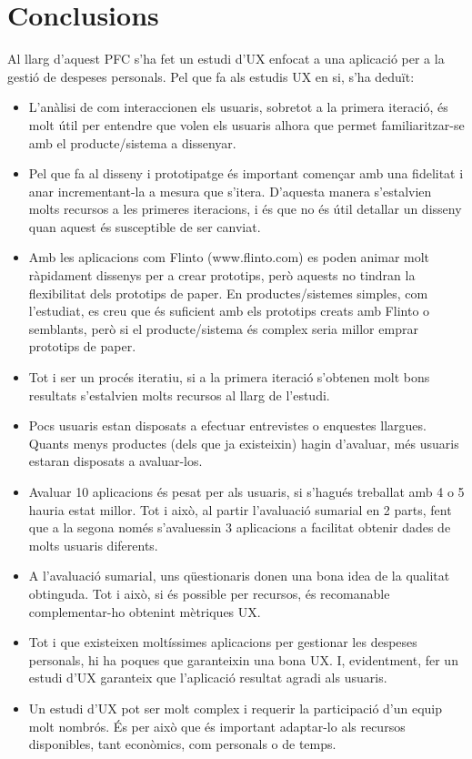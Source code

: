 \chapter{Conclusions}

Al llarg d'aquest \ac{PFC} s'ha fet un estudi d'\ac{UX} enfocat a una aplicació per a la gestió de despeses personals. Pel que fa als estudis \ac{UX} en si, s'ha deduït:

\begin{itemize}
\item L'anàlisi de com interaccionen els usuaris, sobretot a la primera iteració, és molt útil per entendre que volen els usuaris alhora que permet familiaritzar-se amb el producte/sistema a dissenyar.
\item Pel que fa al disseny i prototipatge és important començar amb una fidelitat i anar incrementant-la a mesura que s'itera. D'aquesta manera s'estalvien molts recursos a les primeres iteracions, i és que no és útil detallar un disseny quan aquest és susceptible de ser canviat. %
\item Amb les aplicacions com Flinto (www.flinto.com) es poden animar molt ràpidament dissenys per a crear prototips, però aquests no tindran la flexibilitat dels prototips de paper. En productes/sistemes simples, com l'estudiat, es creu que és suficient amb els prototips creats amb Flinto o semblants, però si el producte/sistema és complex seria millor emprar prototips de paper.
\item Tot i ser un procés iteratiu, si a la primera iteració s'obtenen molt bons resultats s'estalvien molts recursos al llarg de l'estudi. 
\item Pocs usuaris estan disposats a efectuar entrevistes o enquestes llargues. Quants menys productes (dels que ja existeixin) hagin d'avaluar, més usuaris estaran disposats a avaluar-los. 
\item Avaluar 10 aplicacions és pesat per als usuaris, si s'hagués treballat amb 4 o 5 hauria estat millor. Tot i això, al partir l'avaluació sumarial en 2 parts, fent que a la segona només s'avaluessin 3 aplicacions a facilitat obtenir dades de molts usuaris diferents. 
\item A l'avaluació sumarial, uns qüestionaris donen una bona idea de la qualitat obtinguda. Tot i això, si és possible per recursos, és recomanable complementar-ho obtenint mètriques \ac{UX}.
\item Tot i que existeixen moltíssimes aplicacions per gestionar les despeses personals, hi ha poques que garanteixin una bona \ac{UX}. I, evidentment, fer un estudi d'\ac{UX} garanteix que l'aplicació resultat agradi als usuaris. 
\item Un estudi d'\ac{UX} pot ser molt complex i requerir la participació d'un equip molt nombrós. És per això que és important adaptar-lo als recursos disponibles, tant econòmics, com personals o de temps. 
\end{itemize}

